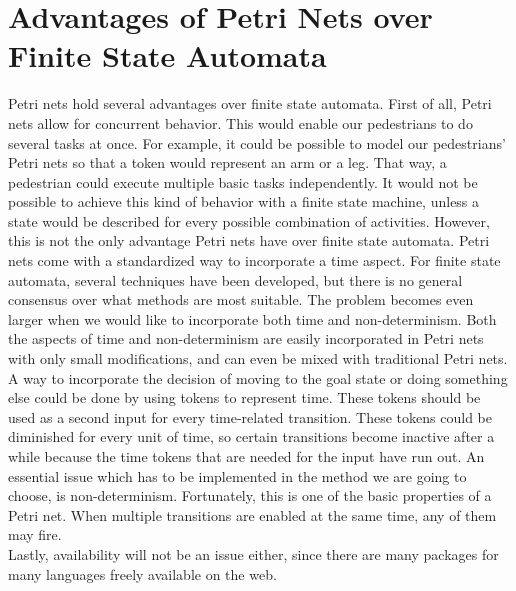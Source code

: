 \documentclass[11pt]{article}
\begin{document}
\section{Advantages of Petri Nets over Finite State Automata}
Petri nets hold several advantages over finite state automata. First of all, Petri nets allow for concurrent behavior. This would enable our pedestrians to do several tasks at once. For example, it could be possible to model our pedestrians' Petri nets so that a token would represent an arm or a leg. That way, a pedestrian could execute multiple basic tasks independently. It would not be possible to achieve this kind of behavior with a finite state machine, unless a state would be described for every possible combination of activities.
However, this is not the only advantage Petri nets have over finite state automata. Petri nets come with a standardized way to incorporate a time aspect. For finite state automata, several techniques have been developed, but there is no general consensus over what methods are most suitable. The problem becomes even larger when we would like to incorporate both time and non-determinism. Both the aspects of time and non-determinism are easily incorporated in Petri nets with only small modifications, and can even be mixed with traditional Petri nets. A way to incorporate the decision of moving to the goal state or doing something else could be done by using tokens to represent time. These tokens should be used as a second input for every time-related transition. These tokens could be diminished for every unit of time, so certain transitions become inactive after a while because the time tokens that are needed for the input have run out. 
An essential issue which has to be implemented in the method we are going to choose, is non-determinism. Fortunately, this is one of the basic properties of a Petri net. When multiple transitions are enabled at the same time, any of them may fire.\\
Lastly, availability will not be an issue either, since there are many packages for many languages freely available on the web. 
\end{document}
